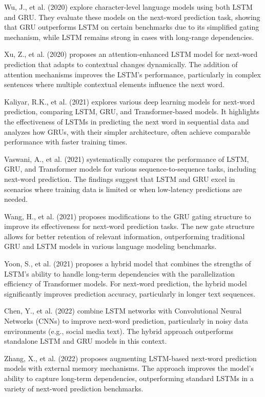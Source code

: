 \documentclass[conference]{IEEEtran}
\begin{document}
Wu, J., et al. (2020) explore character-level language models using both LSTM and GRU. They evaluate these models on the next-word prediction task, showing that GRU outperforms LSTM on certain benchmarks due to its simplified gating mechanism, while LSTM remains strong in cases with long-range dependencies.

Xu, Z., et al. (2020) proposes an attention-enhanced LSTM model for next-word prediction that adapts to contextual changes dynamically. The addition of attention mechanisms improves the LSTM's performance, particularly in complex sentences where multiple contextual elements influence the next word.

Kaliyar, R.K., et al. (2021) explores various deep learning models for next-word prediction, comparing LSTM, GRU, and Transformer-based models. It highlights the effectiveness of LSTMs in predicting the next word in sequential data and analyzes how GRUs, with their simpler architecture, often achieve comparable performance with faster training times.

Vaswani, A., et al. (2021) systematically compares the performance of LSTM, GRU, and Transformer models for various sequence-to-sequence tasks, including next-word prediction. The findings suggest that LSTM and GRU excel in scenarios where training data is limited or when low-latency predictions are needed.

Wang, H., et al. (2021) proposes modifications to the GRU gating structure to improve its effectiveness for next-word prediction tasks. The new gate structure allows for better retention of relevant information, outperforming traditional GRU and LSTM models in various language modeling benchmarks.

Yoon, S., et al. (2021) proposes a hybrid model that combines the strengths of LSTM's ability to handle long-term dependencies with the parallelization efficiency of Transformer models. For next-word prediction, the hybrid model significantly improves prediction accuracy, particularly in longer text sequences.

Chen, Y., et al. (2022) combine LSTM networks with Convolutional Neural Networks (CNNs) to improve next-word prediction, particularly in noisy data environments (e.g., social media text). The hybrid approach outperforms standalone LSTM and GRU models in this context.

Zhang, X., et al. (2022) proposes augmenting LSTM-based next-word prediction models with external memory mechanisms. The approach improves the model's ability to capture long-term dependencies, outperforming standard LSTMs in a variety of next-word prediction benchmarks.
\end{document}
